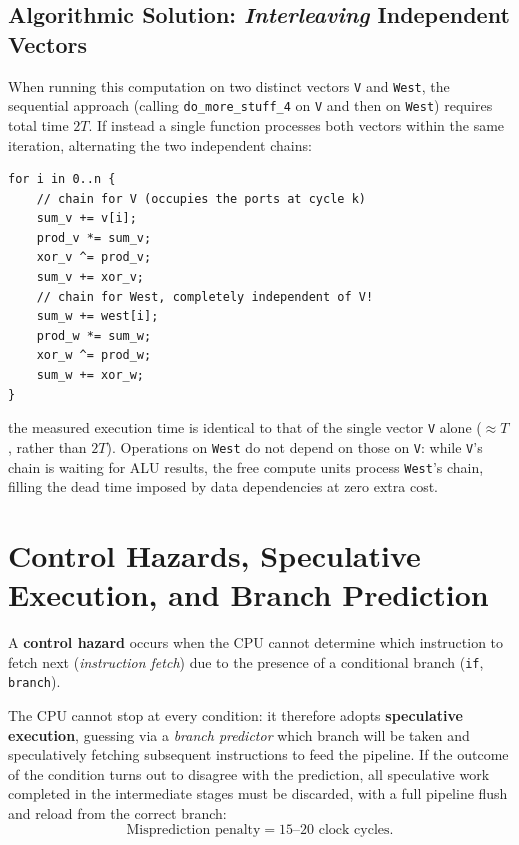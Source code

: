\subsection{Algorithmic Solution: \textit{Interleaving} Independent Vectors}

When running this computation on two distinct vectors \texttt{V} and \texttt{West}, the sequential approach (calling \texttt{do\_more\_stuff\_4} on \texttt{V} and then on \texttt{West}) requires total time $2T$. If instead a single function processes both vectors within the same iteration, alternating the two independent chains:

\begin{lstlisting}[style=rustcode,caption={Fusion (interleaving) of two mutually independent RAW chains.}]
for i in 0..n {
    // chain for V (occupies the ports at cycle k)
    sum_v += v[i];
    prod_v *= sum_v;
    xor_v ^= prod_v;
    sum_v += xor_v;
    // chain for West, completely independent of V!
    sum_w += west[i];
    prod_w *= sum_w;
    xor_w ^= prod_w;
    sum_w += xor_w;
}
\end{lstlisting}

the measured execution time is identical to that of the single vector \texttt{V} alone ($\approx T$, rather than $2T$). Operations on \texttt{West} do not depend on those on \texttt{V}: while \texttt{V}'s chain is waiting for ALU results, the free compute units process \texttt{West}'s chain, filling the dead time imposed by data dependencies at zero extra cost.

\FloatBarrier
\section{Control Hazards, Speculative Execution, and Branch Prediction}

\begin{definition}
A \textbf{control hazard} occurs when the CPU cannot determine which instruction to fetch next (\textit{instruction fetch}) due to the presence of a conditional branch (\texttt{if}, \texttt{branch}).
\end{definition}

The CPU cannot stop at every condition: it therefore adopts \textbf{speculative execution}, guessing via a \textit{branch predictor} which branch will be taken and speculatively fetching subsequent instructions to feed the pipeline. If the outcome of the condition turns out to disagree with the prediction, all speculative work completed in the intermediate stages must be discarded, with a full pipeline flush and reload from the correct branch:
\[
\text{Misprediction penalty} = 15\text{--}20 \text{ clock cycles}.
\]

